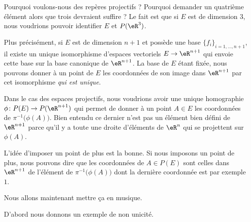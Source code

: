 \begin{normaltext}
Pourquoi voulons-nous des repères projectifs ? Pourquoi demander un quatrième élément alors que trois devraient suffire ? Le fait est que si \( E\) est de dimension \( 3\), nous voudrions pouvoir identifier \( E\) et \( P(\eR^3)\).

Plus précisément, si \( E\) est de dimension \( n+1\) et possède une base \( \{ f_i \}_{i=1,\ldots, n+1}\), il existe un unique isomorphisme d'espaces vectoriels \( E\to \eR^{n+1}\) qui envoie cette base sur la base canonique de \( \eR^{n+1}\). La base de \( E\) étant fixée, nous pouvons donner à un point de \( E\) les coordonnées de son image dans \( \eR^{n+1}\) par cet isomorphisme \emph{qui est unique}.

Dans le cas des espaces projectifs, nous voudrions avoir une unique homographie \( \phi\colon P(E)\to P(\eR^{n+1})\) qui permet de donner à un point \( A\in E\) les coordonnées de \( \pi^{-1}\big( \phi(A) \big)\). Bien entendu ce dernier n'est pas un élément bien défini de \( \eR^{n+1}\) parce qu'il y a toute une droite d'éléments de \( \eR^n\) qui se projettent sur \( \phi(A)\). 

L'idée d'imposer un point de plus est la bonne. Si nous imposons un point de plus, nous pouvons dire que les coordonnées de \( A\in P(E)\) sont celles dans \( \eR^{n+1}\) de l'élément de \( \pi^{-1}\big( \phi(A) \big)\) dont la dernière coordonnée est par exemple \( 1\).

Nous allons maintenant mettre ça en musique.
\end{normaltext}

D'abord nous donnons un exemple de non unicité.

